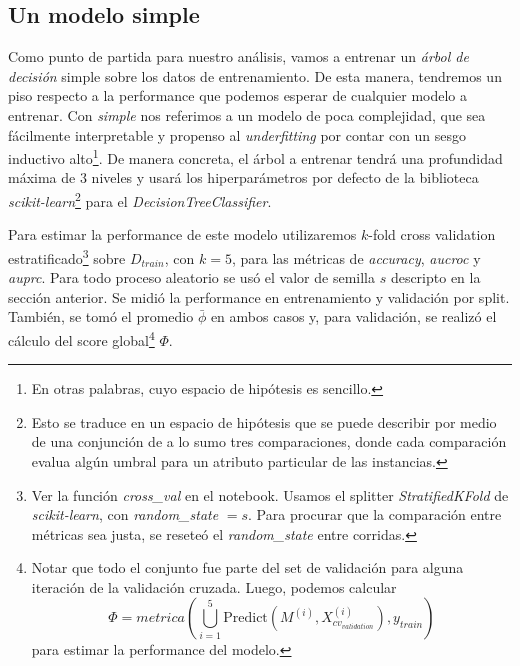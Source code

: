 
\subsection{Un modelo simple}

Como punto de partida para nuestro análisis, vamos a entrenar un \textit{árbol de decisión} simple sobre los datos de entrenamiento. De esta manera, tendremos un piso respecto a la performance que podemos esperar de cualquier modelo a entrenar. Con \textit{simple} nos referimos a un modelo de poca complejidad, que sea fácilmente interpretable y propenso al \textit{underfitting} por contar con un sesgo inductivo alto\footnote{En otras palabras, cuyo espacio de hipótesis es sencillo.}. De manera concreta, el árbol a entrenar tendrá una profundidad máxima de $3$ niveles y usará los hiperparámetros por defecto de la biblioteca \textit{scikit-learn}\footnote{Esto se traduce en un espacio de hipótesis que se puede describir por medio de una conjunción de a lo sumo tres comparaciones, donde cada comparación evalua algún umbral para un atributo particular de las instancias.} para el \textit{DecisionTreeClassifier}.

Para estimar la performance de este modelo utilizaremos $k$-fold cross validation estratificado\footnote{Ver la función \textit{cross\_val} en el notebook. Usamos el splitter \textit{StratifiedKFold} de \textit{scikit-learn}, con \textit{random\_state} $= s$. Para procurar que la comparación entre métricas sea justa, se reseteó el \textit{random\_state} entre corridas.} sobre $D_{train}$, con $k=5$, para las métricas de \textit{accuracy}, \textit{aucroc} y \textit{auprc}. Para todo proceso aleatorio se usó el valor de semilla $s$ descripto en la sección anterior. Se midió la performance en entrenamiento y validación por split. También, se tomó el promedio $\bar\phi$ en ambos casos y, para validación, se realizó el cálculo del score global\footnote{Notar que todo el conjunto fue parte del set de validación para alguna iteración de la validación cruzada. Luego, podemos calcular $$\Phi = metrica(\bigcup_{i=1}^5\text{Predict}(M^{(i)}, X_{cv_{validation}}^{(i)}), y_{train})$$ para estimar la performance del modelo.} $\Phi$.

